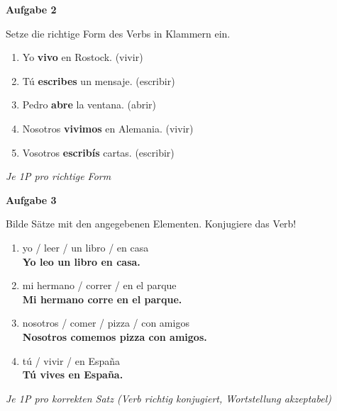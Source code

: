 \documentclass[11pt, a4paper]{article}
\newcommand{\fachfarbe}{spanisch}
\newcommand{\punktebox}[1]{\hfill\fbox{\small \_/#1}}
\newcommand{\lsg}[1]{\textcolor{loesung}{\textbf{#1}}}
\newenvironment{aufgabe}[1]{%
    \vspace{10pt}
    \noindent\textbf{\textcolor{\fachfarbe}{Aufgabe #1}}
    \vspace{5pt}
    \begin{list}{}{\leftmargin=0pt}
    \item[]
}{%
    \end{list}
}
\begin{document}
\begin{aufgabe}{2}
Setze die richtige Form des Verbs in Klammern ein. \punktebox{5}
\end{aufgabe}

\begin{enumerate}[label=\alph*)]
    \item Yo \lsg{vivo} en Rostock. (vivir)
    \item Tú \lsg{escribes} un mensaje. (escribir)
    \item Pedro \lsg{abre} la ventana. (abrir)
    \item Nosotros \lsg{vivimos} en Alemania. (vivir)
    \item Vosotros \lsg{escribís} cartas. (escribir)
\end{enumerate}

\textit{\textcolor{grau}{Je 1P pro richtige Form}}

\vspace{15pt}


\begin{aufgabe}{3}
Bilde Sätze mit den angegebenen Elementen. Konjugiere das Verb! \punktebox{4}
\end{aufgabe}

\begin{enumerate}[label=\alph*)]
    \item yo / leer / un libro / en casa\\
    \lsg{Yo leo un libro en casa.}

    \item mi hermano / correr / en el parque\\
    \lsg{Mi hermano corre en el parque.}

    \item nosotros / comer / pizza / con amigos\\
    \lsg{Nosotros comemos pizza con amigos.}

    \item tú / vivir / en España\\
    \lsg{Tú vives en España.}
\end{enumerate}

\textit{\textcolor{grau}{Je 1P pro korrekten Satz (Verb richtig konjugiert, Wortstellung akzeptabel)}}

\vspace{15pt}
\end{document}
